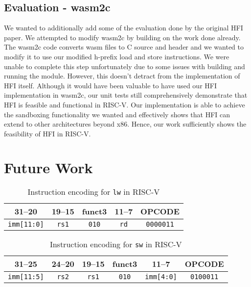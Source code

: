 \documentclass[conference,compsoc]{IEEEtran}
\begin{document}
\subsection{Evaluation - wasm2c}
We wanted to additionally add some of the evaluation done by the original HFI paper. We attempted to modify wasm2c by building on the work done already. The wasm2c code converts wasm files to C source and header and we wanted to modify it to use our modified h-prefix load and store instructions. We were unable to complete this step unfortunately due to some issues with building and running the module. However, this doesn't detract from the implementation of HFI itself. Although it would have been valuable to have used our HFI implementation in wasm2c, our unit tests still comprehensively demonstrate that HFI is feasible and functional in RISC-V. Our implementation is able to achieve the sandboxing functionality we wanted and effectively shows that HFI can extend to other architectures beyond x86. Hence, our work sufficiently shows the feasibility of HFI in RISC-V.

\section{Future Work}

\begin{table}[b]
  \centering
  \caption{Instruction encoding for \texttt{lw} in RISC-V}
  {\fontsize{6.5}{7.5}\selectfont
  \begin{tabular}{|c|c|c|c|c|}
  \hline
  \textbf{31--20} & \textbf{19--15} & \textbf{funct3} & \textbf{11--7} & \textbf{OPCODE} \\
  \hline
  \texttt{imm[11:0]} & \texttt{rs1} & \texttt{010} & \texttt{rd} & \texttt{0000011} \\
  \hline
  \end{tabular}
  }
  \label{tab:lw-encoding}
  \end{table}
  
  \begin{table}[b]
  \centering
  \caption{Instruction encoding for \texttt{sw} in RISC-V}
  {\fontsize{6.5}{7.5}\selectfont
  \begin{tabular}{|c|c|c|c|c|c|}
  \hline
  \textbf{31--25} & \textbf{24--20} & \textbf{19--15} & \textbf{funct3} & \textbf{11--7} & \textbf{OPCODE} \\
  \hline
  \texttt{imm[11:5]} & \texttt{rs2} & \texttt{rs1} & \texttt{010} & \texttt{imm[4:0]} & \texttt{0100011} \\
  \hline
  \end{tabular} 
  }
  \label{tab:sw-encoding}
  \end{table}
  
\end{document}
